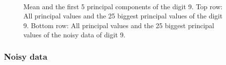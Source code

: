 \documentclass[a4paper, 12pt, titlepage]{article}
\begin{document}
	
\begin{figure}[H]
	\centering
	\\
	\caption{\protect{} Mean and the first 5 principal components of the digit 9. \protect{} Top row: All principal values and the 25 biggest principal values of the digit 9. Bottom row: All principal values and the 25 biggest principal values of the noisy data of digit 9.}
\end{figure}

\subsubsection*{Noisy data}
\end{document}
